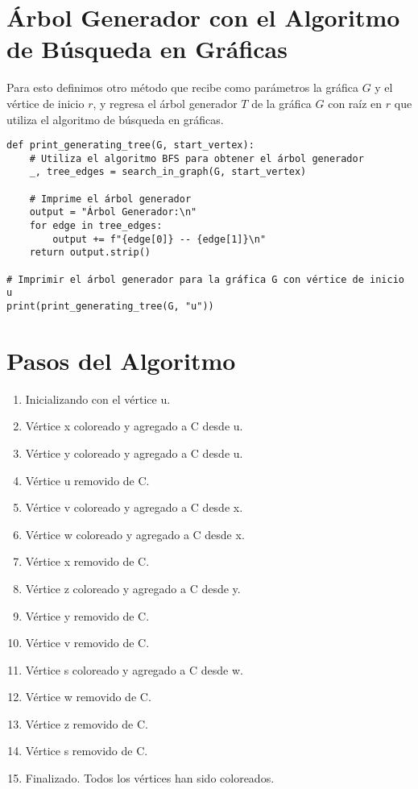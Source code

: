 \documentclass{article}
\begin{document}
\section{Árbol Generador con el Algoritmo de Búsqueda en Gráficas}

Para esto definimos otro método que recibe como parámetros la gráfica \( G \) y el vértice de inicio \( r \), y regresa el árbol generador \( T \) de la gráfica \( G \) con raíz en \( r \) que utiliza el algoritmo de búsqueda en gráficas.

\begin{lstlisting}
def print_generating_tree(G, start_vertex):
    # Utiliza el algoritmo BFS para obtener el árbol generador
    _, tree_edges = search_in_graph(G, start_vertex)
    
    # Imprime el árbol generador
    output = "Árbol Generador:\n"
    for edge in tree_edges:
        output += f"{edge[0]} -- {edge[1]}\n"
    return output.strip()

# Imprimir el árbol generador para la gráfica G con vértice de inicio u
print(print_generating_tree(G, "u"))
\end{lstlisting}

\section{Pasos del Algoritmo}

\begin{enumerate}
    \item Inicializando con el vértice u.
    \item Vértice x coloreado y agregado a C desde u.
    \item Vértice y coloreado y agregado a C desde u.
    \item Vértice u removido de C.
    \item Vértice v coloreado y agregado a C desde x.
    \item Vértice w coloreado y agregado a C desde x.
    \item Vértice x removido de C.
    \item Vértice z coloreado y agregado a C desde y.
    \item Vértice y removido de C.
    \item Vértice v removido de C.
    \item Vértice s coloreado y agregado a C desde w.
    \item Vértice w removido de C.
    \item Vértice z removido de C.
    \item Vértice s removido de C.
    \item Finalizado. Todos los vértices han sido coloreados.
\end{enumerate}
\end{document}
